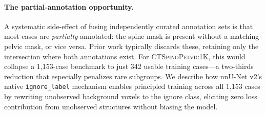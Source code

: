 \documentclass[pmlr]{jmlr}
\newcommand{\dataset}{\textsc{CTSpinoPelvic1K}}
\begin{document}
\paragraph{The partial-annotation opportunity.}
A systematic side-effect of fusing independently curated annotation
sets is that most cases are \emph{partially} annotated: the spine
mask is present without a matching pelvic mask, or vice versa.
Prior work typically discards these, retaining only the intersection
where both annotations exist.
For \dataset{}, this would collapse a 1{,}153-case benchmark to just
342 usable training cases---a two-thirds reduction that especially
penalizes rare subgroups.
We describe how nnU-Net v2's native \texttt{ignore\_label} mechanism
enables principled training across all 1{,}153 cases by rewriting
unobserved background voxels to the ignore class, eliciting zero loss
contribution from unobserved structures without biasing the model.
\end{document}
